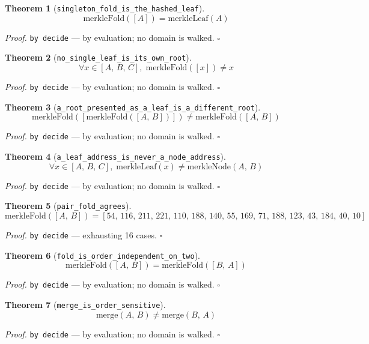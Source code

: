 \documentclass[11pt]{article}
\newtheorem{theorem}{Theorem}[section]
\begin{document}
\begin{theorem}[\texttt{singleton\_fold\_is\_the\_hashed\_leaf}]
\[ \mathrm{merkleFold}\mathopen{}\left([A]\right) = \mathrm{merkleLeaf}\mathopen{}\left(A\right) \]
\end{theorem}
\noindent\emph{Proof.} \texttt{by decide} --- by evaluation; no domain is walked. \hfill$\square$

\begin{theorem}[\texttt{no\_single\_leaf\_is\_its\_own\_root}]
\[ \forall x \in [A,\,B,\,C],\; \mathrm{merkleFold}\mathopen{}\left([x]\right) \neq x \]
\end{theorem}
\noindent\emph{Proof.} \texttt{by decide} --- by evaluation; no domain is walked. \hfill$\square$

\begin{theorem}[\texttt{a\_root\_presented\_as\_a\_leaf\_is\_a\_different\_root}]
\[ \mathrm{merkleFold}\mathopen{}\left([\mathrm{merkleFold}\mathopen{}\left([A,\,B]\right)]\right) \neq \mathrm{merkleFold}\mathopen{}\left([A,\,B]\right) \]
\end{theorem}
\noindent\emph{Proof.} \texttt{by decide} --- by evaluation; no domain is walked. \hfill$\square$

\begin{theorem}[\texttt{a\_leaf\_address\_is\_never\_a\_node\_address}]
\[ \forall x \in [A,\,B,\,C],\; \mathrm{merkleLeaf}\mathopen{}\left(x\right) \neq \mathrm{merkleNode}\mathopen{}\left(A,\,B\right) \]
\end{theorem}
\noindent\emph{Proof.} \texttt{by decide} --- by evaluation; no domain is walked. \hfill$\square$

\begin{theorem}[\texttt{pair\_fold\_agrees}]
\[ \mathrm{merkleFold}\mathopen{}\left([A,\,B]\right) = [54,\,116,\,211,\,221,\,110,\,188,\,140,\,55,\,169,\,71,\,188,\,123,\,43,\,184,\,40,\,10] \]
\end{theorem}
\noindent\emph{Proof.} \texttt{by decide} --- exhausting 16 cases. \hfill$\square$

\begin{theorem}[\texttt{fold\_is\_order\_independent\_on\_two}]
\[ \mathrm{merkleFold}\mathopen{}\left([A,\,B]\right) = \mathrm{merkleFold}\mathopen{}\left([B,\,A]\right) \]
\end{theorem}
\noindent\emph{Proof.} \texttt{by decide} --- by evaluation; no domain is walked. \hfill$\square$

\begin{theorem}[\texttt{merge\_is\_order\_sensitive}]
\[ \mathrm{merge}\mathopen{}\left(A,\,B\right) \neq \mathrm{merge}\mathopen{}\left(B,\,A\right) \]
\end{theorem}
\noindent\emph{Proof.} \texttt{by decide} --- by evaluation; no domain is walked. \hfill$\square$
\end{document}
